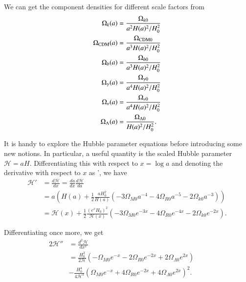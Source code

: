 \documentclass{aa}
\begin{document}
We can get the component densities for different scale factors from
\begin{equation}
\label{eq:omegas}
\begin{aligned}
\Omega_{k}(a) &= \frac{\Omega_{k0}}{a^2H(a)^2/H_0^2}\\
\Omega_{\rm CDM}(a) &= \frac{\Omega_{\rm CDM 0}}{a^3H(a)^2/H_0^2} \\
\Omega_b(a) &= \frac{\Omega_{b 0}}{a^3H(a)^2/H_0^2} \\
\Omega_\gamma(a) &= \frac{\Omega_{\gamma 0}}{a^4H(a)^2/H_0^2} \\
\Omega_{\nu}(a) &= \frac{\Omega_{\nu 0}}{a^4H(a)^2/H_0^2} \\
\Omega_{\Lambda}(a) &= \frac{\Omega_{\Lambda 0}}{H(a)^2/H_0^2}.
\end{aligned}
\end{equation}

It is handy to explore the Hubble parameter equations before introducing some new notions. In particular, a useful quantity is the scaled Hubble parameter $\mathcal H = aH$. Differentiating this with respect to $x = \log a$ and denoting the derivative with respect to $x$ as ', we have
\begin{align}
    \mathcal H' &= \frac{d\mathcal H}{dx} = \frac{da}{dx}\frac{d\mathcal H}{da}\\ 
    &= a\left( H(a) + \frac{1}{2}\frac{aH_0^2}{ H(a)} (-3\Omega_{M0} a^{-4} - 4\Omega_{R0}a^{-5}-2\Omega_{k0}a^{-3})\right)\\
    &= \mathcal H(x) +\frac{1}{2}\frac{(e^xH_0)^2}{\mathcal H(x)}(-3\Omega_{M0} e^{-3x} - 4 \Omega_{R0}e^{-4x}-2\Omega_{k0}e^{-2x}).
\end{align}

Differentiating once more, we get
\begin{alignat*}{2}
    \mathcal H'' &= \frac{d^2\mathcal H}{dx^2}&&\\ 
    &= \frac{H_0^2}{2\mathcal{H}}\left(-\Omega_{M0} e^{-x}-2\Omega_{R0}e^{-2x}+2\Omega_{\Lambda0}e^{2x}\right) \\&-\frac{H_0^4}{4\mathcal{H}^3}\left(\Omega_{M0}e^{-x}+4\Omega_{R0}e^{-2x}+4\Omega_{\Lambda0}e^{2x}\right)^2.
\end{alignat*}
\end{document}
